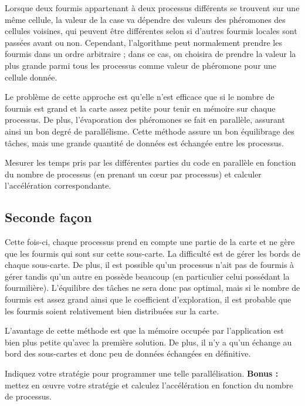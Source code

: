 \documentclass[11pt]{article}
\begin{document}
Lorsque deux fourmis appartenant à deux processus différents se trouvent sur une même cellule, la valeur de la case va dépendre des valeurs des phéromones des cellules voisines, qui peuvent être différentes selon si d'autres fourmis locales sont passées avant ou non. Cependant, l'algorithme peut normalement prendre les fourmis dans un ordre arbitraire ; dans ce cas, on choisira de prendre la valeur la plus grande parmi tous les processus comme valeur de phéromone pour une cellule donnée.

Le problème de cette approche est qu'elle n'est efficace que si le nombre de fourmis est grand et la carte assez petite pour tenir en mémoire sur chaque processus. De plus, l'évaporation des phéromones se fait en parallèle, assurant ainsi un bon degré de parallélisme. Cette méthode assure un bon équilibrage des tâches, mais une grande quantité de données est échangée entre les processus.

Mesurer les temps pris par les différentes parties du code en parallèle en fonction du nombre de processus (en prenant un cœur par processus) et calculer l'accélération correspondante.

\subsection{Seconde façon}
Cette fois-ci, chaque processus prend en compte une partie de la carte et ne gère que les fourmis qui sont sur cette sous-carte. La difficulté est de gérer les bords de chaque sous-carte. De plus, il est possible qu'un processus n'ait pas de fourmis à gérer tandis qu'un autre en possède beaucoup (en particulier celui possédant la fourmilière). L'équilibre des tâches ne sera donc pas optimal, mais si le nombre de fourmis est assez grand ainsi que le coefficient d'exploration, il est probable que les fourmis soient relativement bien distribuées sur la carte.

L'avantage de cette méthode est que la mémoire occupée par l'application est bien plus petite qu'avec la première solution. De plus, il n'y a qu'un échange au bord des sous-cartes et donc peu de données échangées en définitive.

Indiquez votre stratégie pour programmer une telle parallélisation. \textbf{Bonus :} mettez en œuvre votre stratégie et calculez l'accélération en fonction du nombre de processus.
\end{document}

